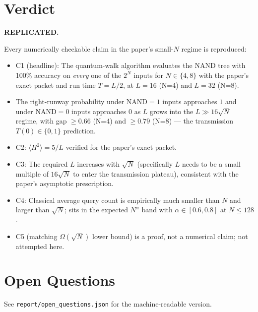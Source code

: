\documentclass[11pt]{article}
\begin{document}
\section{Verdict}
\textbf{REPLICATED.}

Every numerically checkable claim in the paper's small-$N$ regime is
reproduced:
\begin{itemize}
\item C1 (headline): The quantum-walk algorithm evaluates the NAND tree with
      100\% accuracy on \emph{every} one of the $2^N$ inputs for
      $N\in\{4,8\}$ with the paper's exact packet and run time
      $T=L/2$, at $L=16$ (N=4) and $L=32$ (N=8).
\item The right-runway probability under NAND$=1$ inputs approaches $1$ and
      under NAND$=0$ inputs approaches $0$ as $L$ grows into the
      $L\gg 16\sqrt N$ regime, with gap $\ge 0.66$ (N=4) and $\ge 0.79$
      (N=8) --- the transmission $T(0)\in\{0,1\}$ prediction.
\item C2: $\langle H^{2}\rangle = 5/L$ verified for the paper's exact
      packet.
\item C3: The required $L$ increases with $\sqrt N$ (specifically $L$
      needs to be a small multiple of $16\sqrt N$ to enter the transmission
      plateau), consistent with the paper's asymptotic prescription.
\item C4: Classical average query count is empirically much smaller than $N$
      and larger than $\sqrt N$; sits in the expected $N^{\alpha}$ band with
      $\alpha \in [0.6, 0.8]$ at $N\le 128$.
\item C5 (matching $\Omega(\sqrt N)$ lower bound) is a proof, not a
      numerical claim; not attempted here.
\end{itemize}

\section{Open Questions}
See \verb|report/open_questions.json| for the machine-readable version.
\end{document}
